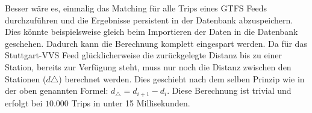     \pagebreak

    Besser wäre es, einmalig das Matching für alle Trips eines GTFS Feeds durchzuführen und die Ergebnisse persistent in der Datenbank abzuspeichern. Dies könnte beispielsweise gleich beim Importieren der Daten in die Datenbank geschehen. Dadurch kann die Berechnung komplett eingespart werden. 
    Da für das Stuttgart-VVS Feed glücklicherweise die zurückgelegte Distanz bis zu einer Station, bereits zur Verfügung steht, muss nur noch die Distanz zwischen den Stationen ($d\triangle$) berechnet werden. Dies geschieht nach dem selben Prinzip wie in der oben genannten Formel: $ d_\triangle = d_{i+1} - d_i$. Diese Berechnung ist trivial und erfolgt bei $10.000$ Trips in unter 15 Millisekunden.
    
   
